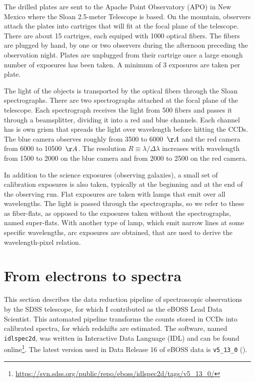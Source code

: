 The drilled plates are sent to the Apache Point Observatory (APO) in New Mexico
where the Sloan 2.5-meter Telescope is based. On the mountain, 
observers attach the plates into cartriges that will fit at the focal plane of the
telescope. There are about 15 cartriges, each equiped with 1000 optical fibers.
The fibers are plugged by hand, by one or two observers during the afternoon preceding 
the observation night. Plates are unplugged from their cartrige once a large enough 
number of exposures has been taken. A minimum of 3 exposures are taken per plate.
 
The light of the objects is transported by the optical fibers through the 
Sloan spectrographs. There are two spectrographs attached at the focal plane
of the telescope. Each spectrograph receives the light from 500 fibers and passes 
it through a beamsplitter, dividing it into a red and blue channels. 
Each channel has is own grism that spreads the light over wavelength before
hitting the CCDs. The blue camera observes roughly from 3500 to 6000~$\AA$ and the red
camera from 6000 to 10500~$\AA$. The resolution $R \equiv \lambda / \Delta \lambda$ 
increases with wavelength from 1500 to 2000 on the blue camera and from 2000 to 2500 
on the red camera. 

In addition to the science exposures (observing galaxies), a small set
of calibration exposures is also taken, typically at the beginning and at the end 
of the observing run. Flat exposures are taken with lamps that emit over all 
wavelengths. The light is passed through the spectrographs, so we refer to these
as fiber-flats, as opposed to the exposures taken without the spectrographs, named 
super-flats. With another type of lamp, which emit narrow lines at some specific 
wavelengths, arc exposures are obtained, that are used to derive the wavelength-pixel 
relation. 

\section{From electrons to spectra}
\label{spectro:pipeline2d}

This section describes the data reduction pipeline of 
spectroscopic observations by the SDSS telescope, for which 
I contributed as the eBOSS Lead Data Scientist. 
This automated pipeline transforms the counts stored in CCDs into 
calibrated spectra, for which redshifts are estimated. 
The software, named \texttt{idlspec2d}, was written in Interactive Data Language (IDL)
and can be found online\footnote{\url{https://svn.sdss.org/public/repo/eboss/idlspec2d/tags/v5_13_0/}}.
The latest version used in Data Release 16 
of eBOSS data is \texttt{v5\_13\_0} (\cite{ahumada16thDataRelease2020}).



